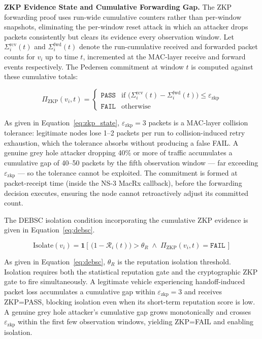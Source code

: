 \documentclass[12pt, a4paper]{report}
\newcommand{\mypar}{\vspace{0.8em}\noindent}
\begin{document}
\mypar
\textbf{ZKP Evidence State and Cumulative Forwarding Gap.}
The ZKP forwarding proof uses run-wide cumulative counters rather
than per-window snapshots, eliminating the per-window reset attack
in which an attacker drops packets consistently but clears its
evidence every observation window. Let $\Sigma_i^{\mathrm{rcv}}(t)$
and $\Sigma_i^{\mathrm{fwd}}(t)$ denote the run-cumulative received
and forwarded packet counts for $v_i$ up to time $t$, incremented
at the MAC-layer receive and forward events respectively. The
Pedersen commitment at window $t$ is computed against these
cumulative totals:

\begin{equation}
\label{eq:zkp_state}
\Pi_{\text{ZKP}}(v_i, t) =
\begin{cases}
\texttt{PASS}
  & \text{if } \bigl(\Sigma_i^{\mathrm{rcv}}(t)
    - \Sigma_i^{\mathrm{fwd}}(t)\bigr)
    \leq \varepsilon_{\text{zkp}} \\[4pt]
\texttt{FAIL}
  & \text{otherwise}
\end{cases}
\end{equation}

As given in Equation~\eqref{eq:zkp_state},
$\varepsilon_{\text{zkp}}=3$ packets is a MAC-layer collision
tolerance: legitimate nodes lose 1--2 packets per run to
collision-induced retry exhaustion, which the tolerance absorbs
without producing a false FAIL. A genuine grey hole attacker
dropping 40\% or more of traffic accumulates a cumulative gap of
40--50 packets by the fifth observation window — far exceeding
$\varepsilon_{\text{zkp}}$ — so the tolerance cannot be exploited.
The commitment is formed at packet-receipt time (inside the NS-3
MacRx callback), before the forwarding decision executes, ensuring
the node cannot retroactively adjust its committed count.

\mypar
The DEBSC isolation condition incorporating the cumulative ZKP
evidence is given in Equation~\eqref{eq:debsc}.

\begin{equation}
\label{eq:debsc}
\mathrm{Isolate}(v_i) =
\mathbf{1}\!\left[\,
\bigl(1 - \mathcal{R}_i(t)\bigr) > \theta_R
\;\wedge\;
\Pi_{\text{ZKP}}(v_i, t) = \texttt{FAIL}
\,\right]
\end{equation}

As given in Equation~\eqref{eq:debsc}, $\theta_R$ is the
reputation isolation threshold. Isolation requires both the
statistical reputation gate and the cryptographic ZKP gate to
fire simultaneously. A legitimate vehicle experiencing
handoff-induced packet loss accumulates a cumulative gap within
$\varepsilon_{\text{zkp}}=3$ and receives ZKP=PASS, blocking
isolation even when its short-term reputation score is low.
A genuine grey hole attacker's cumulative gap grows monotonically
and crosses $\varepsilon_{\text{zkp}}$ within the first few
observation windows, yielding ZKP=FAIL and enabling isolation.
\end{document}
